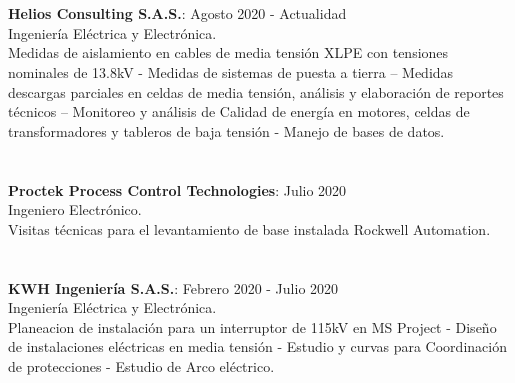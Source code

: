 \documentclass[margin]{res}
\begin{document}
\begin{resume}
\section{\centering}
\hfill \break
\textbf{Helios Consulting S.A.S.}: \hfill Agosto 2020 - Actualidad
\\Ingeniería Eléctrica y Electrónica.
\\Medidas de aislamiento en cables de media tensión XLPE con tensiones nominales de 13.8kV - Medidas de sistemas de puesta a tierra – Medidas descargas parciales en celdas de media tensión, análisis y elaboración de reportes técnicos – Monitoreo y análisis de Calidad de energía en motores, celdas de transformadores y tableros de baja tensión - Manejo de bases de datos.

\section{\centering}
\hfill \break
\textbf{Proctek Process Control Technologies}: \hfill Julio 2020
\\ Ingeniero Electrónico.
\\Visitas técnicas para el levantamiento de base instalada Rockwell Automation.

\section{\centering}
\hfill \break
\textbf{KWH Ingeniería S.A.S.}: \hfill Febrero 2020 - Julio 2020
\\Ingeniería Eléctrica y Electrónica.
\\Planeacion de instalación para un interruptor de 115kV en MS Project - Diseño de instalaciones eléctricas en media tensión - Estudio y curvas para Coordinación de protecciones - Estudio de Arco eléctrico. 


\end{resume}
\end{document}
